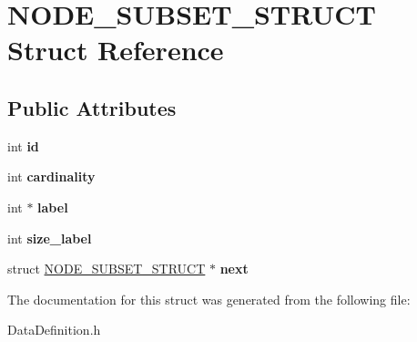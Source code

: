 \hypertarget{structNODE__SUBSET__STRUCT}{\section{N\-O\-D\-E\-\_\-\-S\-U\-B\-S\-E\-T\-\_\-\-S\-T\-R\-U\-C\-T Struct Reference}
\label{structNODE__SUBSET__STRUCT}
}
\subsection*{Public Attributes}
\begin{DoxyCompactItemize}
\item 
\hypertarget{structNODE__SUBSET__STRUCT_a8047d3c37caf8eed1d5cf1db677a6e6a}{int {\bfseries id}}\label{structNODE__SUBSET__STRUCT_a8047d3c37caf8eed1d5cf1db677a6e6a}

\item 
\hypertarget{structNODE__SUBSET__STRUCT_a8945dd5c7d8177ffbee4acd74ab600d2}{int {\bfseries cardinality}}\label{structNODE__SUBSET__STRUCT_a8945dd5c7d8177ffbee4acd74ab600d2}

\item 
\hypertarget{structNODE__SUBSET__STRUCT_a4c704f400a1fa5bb309c1c243422eda1}{int $\ast$ {\bfseries label}}\label{structNODE__SUBSET__STRUCT_a4c704f400a1fa5bb309c1c243422eda1}

\item 
\hypertarget{structNODE__SUBSET__STRUCT_ab2b2587d1db1672a8dcf6e7050b30f82}{int {\bfseries size\-\_\-label}}\label{structNODE__SUBSET__STRUCT_ab2b2587d1db1672a8dcf6e7050b30f82}

\item 
\hypertarget{structNODE__SUBSET__STRUCT_a23d8738ae1b4513d607523d289e40ace}{struct \hyperlink{structNODE__SUBSET__STRUCT}{N\-O\-D\-E\-\_\-\-S\-U\-B\-S\-E\-T\-\_\-\-S\-T\-R\-U\-C\-T} $\ast$ {\bfseries next}}\label{structNODE__SUBSET__STRUCT_a23d8738ae1b4513d607523d289e40ace}

\end{DoxyCompactItemize}


The documentation for this struct was generated from the following file\-:\begin{DoxyCompactItemize}
\item 
Data\-Definition.\-h\end{DoxyCompactItemize}
